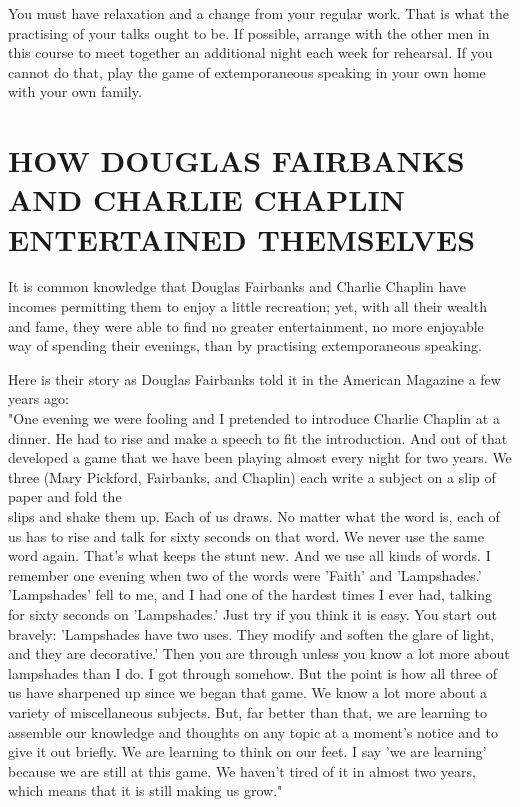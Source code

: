 \documentclass[10pt]{article}
\begin{document}
You must have relaxation and a change from your regular work. That is what the practising of your talks ought to be. If possible, arrange with the other men in this course to meet together an additional night each week for rehearsal. If you cannot do that, play the game of extemporaneous speaking in your own home with your own family.

\section*{HOW DOUGLAS FAIRBANKS AND CHARLIE CHAPLIN ENTERTAINED THEMSELVES}
It is common knowledge that Douglas Fairbanks and Charlie Chaplin have incomes permitting them to enjoy a little recreation; yet, with all their wealth and fame, they were able to find no greater entertainment, no more enjoyable way of spending their evenings, than by practising extemporaneous speaking.

Here is their story as Douglas Fairbanks told it in the American Magazine a few years ago:\\
"One evening we were fooling and I pretended to introduce Charlie Chaplin at a dinner. He had to rise and make a speech to fit the introduction. And out of that developed a game that we have been playing almost every night for two years. We three (Mary Pickford, Fairbanks, and Chaplin) each write a subject on a slip of paper and fold the\\
slips and shake them up. Each of us draws. No matter what the word is, each of us has to rise and talk for sixty seconds on that word. We never use the same word again. That's what keeps the stunt new. And we use all kinds of words. I remember one evening when two of the words were 'Faith' and 'Lampshades.' 'Lampshades' fell to me, and I had one of the hardest times I ever had, talking for sixty seconds on 'Lampshades.' Just try if you think it is easy. You start out bravely: 'Lampshades have two uses. They modify and soften the glare of light, and they are decorative.' Then you are through unless you know a lot more about lampshades than I do. I got through somehow. But the point is how all three of us have sharpened up since we began that game. We know a lot more about a variety of miscellaneous subjects. But, far better than that, we are learning to assemble our knowledge and thoughts on any topic at a moment's notice and to give it out briefly. We are learning to think on our feet. I say 'we are learning' because we are still at this game. We haven't tired of it in almost two years, which means that it is still making us grow."
\end{document}
